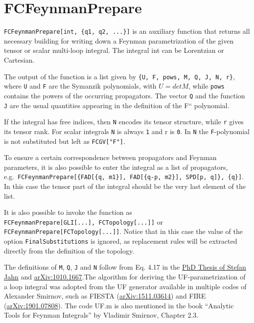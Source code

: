 \documentclass[../FeynCalcManual.tex]{subfiles}
\begin{document}
\hypertarget{fcfeynmanprepare}{
\section{FCFeynmanPrepare}\label{fcfeynmanprepare}}

\texttt{FCFeynmanPrepare[\allowbreak{}int,\ \allowbreak{}\{\allowbreak{}q1,\ \allowbreak{}q2,\ \allowbreak{}...\}]}
is an auxiliary function that returns all necessary building for writing
down a Feynman parametrization of the given tensor or scalar multi-loop
integral. The integral int can be Lorentzian or Cartesian.

The output of the function is a list given by
\texttt{\{\allowbreak{}U,\ \allowbreak{}F,\ \allowbreak{}pows,\ \allowbreak{}M,\ \allowbreak{}Q,\ \allowbreak{}J,\ \allowbreak{}N,\ \allowbreak{}r\}},
where \texttt{U} and \texttt{F} are the Symanzik polynomials, with
\(U = det M\), while \texttt{pows} contains the powers of the occurring
propagators. The vector \texttt{Q} and the function \texttt{J} are the
usual quantities appearing in the definition of the F`` polynomial.

If the integral has free indices, then \texttt{N} encodes its tensor
structure, while \texttt{r} gives its tensor rank. For scalar integrals
\texttt{N} is always \texttt{1} and r is \texttt{0}. In \texttt{N} the
\texttt{F}-polynomial is not substituted but left as
\texttt{FCGV[\allowbreak{}"F"]}.

To ensure a certain correspondence between propagators and Feynman
parameters, it is also possible to enter the integral as a list of
propagators,
e.g.~\texttt{FCFeynmanPrepare[\allowbreak{}\{\allowbreak{}FAD[\allowbreak{}\{\allowbreak{}q,\ \allowbreak{}m1\}],\ \allowbreak{}FAD[\allowbreak{}\{\allowbreak{}q-p,\ \allowbreak{}m2\}],\ \allowbreak{}SPD[\allowbreak{}p,\ \allowbreak{}q]\},\ \allowbreak{}\{\allowbreak{}q\}]}.
In this case the tensor part of the integral should be the very last
element of the list.

It is also possible to invoke the function as
\texttt{FCFeynmanPrepare[\allowbreak{}GLI[\allowbreak{}...],\ \allowbreak{}FCTopology[\allowbreak{}...]]}
or \texttt{FCFeynmanPrepare[\allowbreak{}FCTopology[\allowbreak{}...]]}.
Notice that in this case the value of the option
\texttt{FinalSubstitutions} is ignored, as replacement rules will be
extracted directly from the definition of the topology.

The definitions of \texttt{M}, \texttt{Q}, \texttt{J} and \texttt{N}
follow from Eq. 4.17 in the
\href{http://mediatum.ub.tum.de/?id=1524691}{PhD Thesis of Stefan Jahn}
and \href{https://arxiv.org/abs/1010.1667}{arXiv:1010.1667}.The
algorithm for deriving the UF-parametrization of a loop integral was
adopted from the UF generator available in multiple codes of Alexander
Smirnov, such as FIESTA
(\href{https://arxiv.org/abs/1511.03614}{arXiv:1511.03614}) and FIRE
(\href{https://arxiv.org/abs/1901.07808}{arXiv:1901.07808}). The code
UF.m is also mentioned in the book ``Analytic Tools for Feynman
Integrals'' by Vladimir Smirnov, Chapter 2.3.
\end{document}
